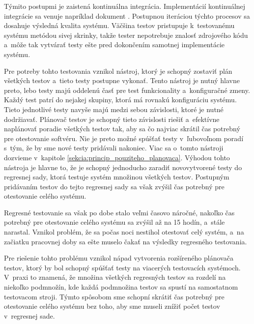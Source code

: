 Týmito postupmi je zaistená kontinuálna integrácia. 
Implementácií kontinuálnej integrácie sa venuje napríklad dokument 
\cite{Continuous_integration_implementation}. 
Postupnou iteráciou týchto procesov sa dosahuje výsledná kvalita systému. 
Väčšina testov pristupuje k~testovanému systému metódou sivej skrinky, 
takže tester nepotrebuje znalosť zdrojového kódu a~môže tak vytvárať 
testy ešte pred dokončením samotnej implementácie systému. 

Pre potreby tohto testovania vznikol nástroj, ktorý je schopný zostaviť 
plán všetkých testov a~tieto testy postupne vykonať. Tento nástroj je
nutný hlavne preto, lebo testy majú oddelenú časť pre
test funkcionality a~konfiguračné zmeny. Každý test patrí do nejakej 
skupiny, ktorá má rovnakú konfiguráciu systému. 
Tieto jednotlivé testy navyše majú medzi sebou závislosti, ktoré je 
nutné dodržiavať. Plánovač testov je schopný tieto závislosti riešiť 
a~efektívne naplánovať poradie všetkých testov tak, aby sa čo najviac 
skrátil čas potrebný pre otestovanie softvéru. Nie je preto možné spúšťať
testy v~ľubovoľnom poradí s~tým, že by sme nové testy pridávali nakoniec.
Viac sa o~tomto nástroji dozvieme v~kapitole
\ref{sekcia:princip_pouziteho_planovaca}.
Výhodou tohto nástroja je hlavne to, že je schopný jednoducho zaradiť 
novovytvorené testy do regresnej sady, ktorá testuje systém množinou 
všetkých testov. Postupným pridávaním testov do tejto regresnej sady sa 
však zvýšil čas potrebný pre otestovanie celého systému.

Regresné testovanie sa však po dobe stalo veľmi časovo náročné, nakoľko 
čas potrebný pre otestovanie celého systému sa zvýšil až na 15 hodín, 
a~stále narastal.
Vznikol problém, že sa počas noci nestihol otestovať celý systém, a~na 
začiatku pracovnej doby sa ešte muselo čakať na výsledky regresného 
testovania. 

Pre riešenie tohto problému vznikol nápad vytvorenia 
rozšíreného plánovača testov, ktorý by bol schopný spúšťať testy na 
viacerých testovacích systémoch.
V~praxi to znamená, že množina všetkých regresných testov sa rozdelí na 
niekoľko podmnožín, kde každá podmnožina testov sa spustí na samostatnom
testovacom stroji. 
Týmto spôsobom sme schopní skrátiť čas potrebný pre otestovanie celého 
systému bez toho, aby sme museli znížiť počet testov v~regresnej sade. 

